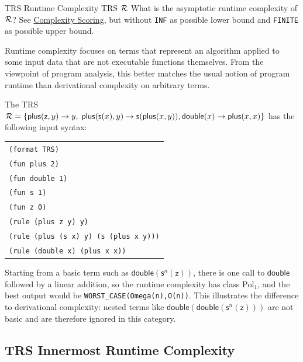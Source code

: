 \begin{formalproblem}
  {TRS Runtime Complexity}
  {TRS $\mathcal{R}$}
  {What is the asymptotic runtime complexity of $\mathcal{R}$?}
  {See \hyperref[scoring_complexity]{Complexity Scoring}, but without \texttt{INF} as possible lower bound and \texttt{FINITE} as possible upper bound.}
\end{formalproblem}

\begin{motivation}
Runtime complexity focuses on terms that represent 
an algorithm applied to some input data that are not executable functions themselves.
From the viewpoint of program analysis, 
this better matches the usual notion of program runtime 
than derivational complexity on arbitrary terms.
\end{motivation}

\begin{example}
The TRS $\mathcal{R} = \{\mathsf{plus}(\mathsf{z}, y) \to y,\; \mathsf{plus}(\mathsf{s}(x), y) \to \mathsf{s}(\mathsf{plus}(x,y)),
\linebreak \mathsf{double}(x) \to \mathsf{plus}(x,x)\}$ has the following input syntax:
\begin{center}
\begin{tabular}{l}
\texttt{(format TRS)} \\
\texttt{(fun plus 2)} \\
\texttt{(fun double 1)} \\
\texttt{(fun s 1)} \\
\texttt{(fun z 0)} \\
\texttt{(rule (plus z y) y)} \\
\texttt{(rule (plus (s x) y) (s (plus x y)))} \\
\texttt{(rule (double x) (plus x x))}
\end{tabular}
\end{center}
Starting from a basic term such as $\mathsf{double}(\mathsf{s}^n(\mathsf{z}))$, 
there is one call to $\mathsf{double}$ followed by a linear addition, 
so the runtime complexity has class $\mathrm{Pol}_1$, and the best output would be \texttt{WORST\_CASE(Omega(n),O(n))}. 
This illustrates the difference to derivational complexity: nested terms like 
$\mathsf{double}(\mathsf{double}(\mathsf{s}^n(\mathsf{z})))$ are not basic and are therefore ignored in this category.
\end{example}

\subsection{TRS Innermost Runtime Complexity}

